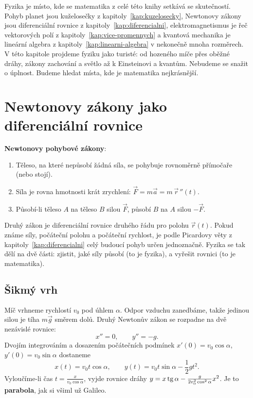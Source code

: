 \label{kap:fyzika}

Fyzika je místo, kde se matematika z celé této knihy setkává se skutečností. Pohyb planet jsou kuželosečky z kapitoly~\ref{kap:kuzelosecky}, Newtonovy zákony jsou diferenciální rovnice z kapitoly~\ref{kap:diferencialni}, elektromagnetismus je řeč vektorových polí z kapitoly~\ref{kap:vice-promennych} a kvantová mechanika je lineární algebra z kapitoly~\ref{kap:linearni-algebra} v nekonečně mnoha rozměrech. V této kapitole projdeme fyziku jako turisté: od hozeného míče přes oběžné dráhy, zákony zachování a světlo až k Einsteinovi a kvantům. Nebudeme se snažit o úplnost. Budeme hledat místa, kde je matematika nejkrásnější.

\section{Newtonovy zákony jako diferenciální rovnice}

\begin{definitionbox}
  \textbf{Newtonovy pohybové zákony}:
  \begin{enumerate}
    \item Těleso, na které nepůsobí žádná síla, se pohybuje rovnoměrně přímočaře (nebo stojí).
    \item Síla je rovna hmotnosti krát zrychlení: $\vec{F} = m\vec{a} = m\,\vec{r}\,''(t)$.
    \item Působí-li těleso $A$ na těleso $B$ silou $\vec{F}$, působí $B$ na $A$ silou $-\vec{F}$.
  \end{enumerate}
\end{definitionbox}

Druhý zákon je diferenciální rovnice druhého řádu pro polohu $\vec{r}(t)$. Pokud známe síly, počáteční polohu a počáteční rychlost, je podle Picardovy věty z kapitoly~\ref{kap:diferencialni} celý budoucí pohyb určen jednoznačně. Fyzika se tak dělí na dvě části: zjistit, jaké síly působí (to je fyzika), a vyřešit rovnici (to je matematika).

\subsection{Šikmý vrh}

Míč vrhneme rychlostí $v_0$ pod úhlem $\alpha$. Odpor vzduchu zanedbáme, takže jedinou silou je tíha $m\vec{g}$ směrem dolů. Druhý Newtonův zákon se rozpadne na dvě nezávislé rovnice:
\begin{equation*}
  x'' = 0,\qquad y'' = -g.
\end{equation*}
Dvojím integrováním a dosazením počátečních podmínek $x'(0) = v_0\cos\alpha$, $y'(0) = v_0\sin\alpha$ dostaneme
\begin{equation*}
  x(t) = v_0t\cos\alpha,\qquad y(t) = v_0t\sin\alpha - \frac{1}{2}gt^2.
\end{equation*}
Vyloučíme-li čas $t = \frac{x}{v_0\cos\alpha}$, vyjde rovnice dráhy $y = x\operatorname{tg}\alpha - \frac{g}{2v_0^2\cos^2\alpha}x^2$. Je to \textbf{parabola}, jak si všiml už Galileo.

